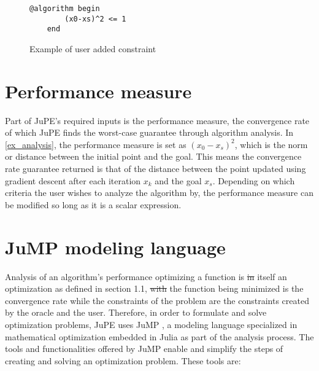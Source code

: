\begin{figure}[h]
	\begin{lstlisting}[mathescape]
	@algorithm begin
		(x0-xs)^2 <= 1
	end
	\end{lstlisting}
	\caption{Example of user added constraint }
	\label{ex_user_constraints}
\end{figure}

\section{Performance measure}
Part of JuPE's required inputs is the performance measure, the convergence rate of which JuPE finds the worst-case guarantee through algorithm analysis. In \ref{ex_analysis}, the performance measure is set as $ (x_0 - x_s) ^2 $, which is the norm or distance between the initial point and the goal. This means the convergence rate guarantee returned is that of the distance between the point updated using gradient descent after each iteration $ x_k $ and the goal $ x_s $. Depending on which criteria the user wishes to analyze the algorithm by, the performance measure can be modified so long as it is a scalar expression.

\section{JuMP modeling language}
Analysis of an algorithm's performance optimizing a function is \sout{in} itself an optimization  as defined in section 1.1, \sout{with}  the function being minimized is the convergence rate while the constraints of the problem are the constraints created by the oracle and the user. Therefore, in order to formulate and solve optimization problems, JuPE uses JuMP , a modeling language specialized in mathematical optimization embedded in Julia as part of the analysis process. The tools and functionalities offered by JuMP enable and simplify the steps of creating and solving an optimization problem. These tools are:

